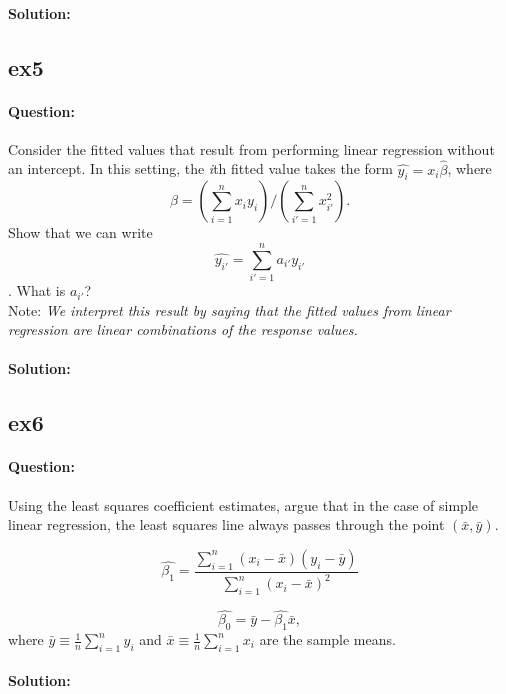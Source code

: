 \documentclass[a4paper,12pt,titlepage]{article} %
\begin{document}
\paragraph{Solution:}

\subsection{ex5}
\paragraph{Question:} Consider the fitted values that result from performing linear regression without an intercept. In this setting, the \textit{i}th fitted value takes the form $\hat{y_{i}} = x_{i} \hat{\beta}$, where $$\beta = \left( \displaystyle\sum_{i=1}^{n} x_{i} y_{i} \right) / \left( \displaystyle\sum_{i'=1}^{n} x_{i'}^{2} \right).$$ Show that we can write $$ \hat{y_{i'}} = \displaystyle\sum_{i'=1}^{n} a_{i'} y_{i'}$$. What is $a_{i'}$?\\

Note: \textit{We interpret this result by saying that the fitted values from linear regression are linear combinations of the response values.}

\paragraph{Solution:}

\subsection{ex6}
	
\paragraph{Question:} Using the least squares coefficient estimates, argue that in the case of simple linear regression, the least squares line always passes through the point $(\bar{x},\bar{y})$.

$$ \hat{\beta_{1}} = \frac{\sum_{i=1}^{n} (x_{i}-\bar{x}) (y_{i}-\bar{y})}{ \sum_{i=1}^{n} (x_{i}-\bar{x})^{2} } $$

$$ \hat{\beta_{0}} = \bar{y} - \hat{\beta_{1}} \bar{x}, $$ where $\bar{y} \equiv \frac{1}{n} \sum_{i=1}^{n} y_{i} $ and $\bar{x} \equiv \frac{1}{n} \sum_{i=1}^{n} x_{i} $ are the sample means.

\paragraph{Solution:}
\end{document}
